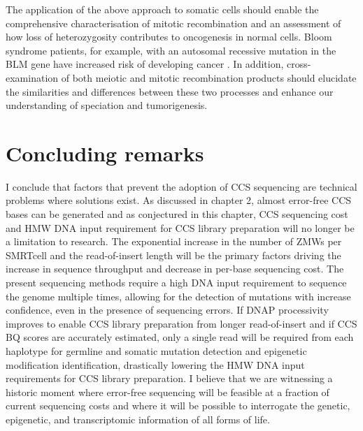 The application of the above approach to somatic cells should enable the comprehensive characterisation of mitotic recombination and an assessment of how loss of heterozygosity contributes to oncogenesis in normal cells. Bloom syndrome patients, for example, with an autosomal recessive mutation in the BLM gene have increased risk of developing cancer \cite{Gruber2002-ck}. In addition, cross-examination of both meiotic and mitotic recombination products should elucidate the similarities and differences between these two processes and enhance our understanding of speciation and tumorigenesis. 

\section{Concluding remarks}

I conclude that factors that prevent the adoption of CCS sequencing are technical problems where solutions exist. As discussed in chapter 2, almost error-free CCS bases can be generated and as conjectured in this chapter, CCS sequencing cost and HMW DNA input requirement for CCS library preparation will no longer be a limitation to research. The exponential increase in the number of ZMWs per SMRTcell and the read-of-insert length will be the primary factors driving the increase in sequence throughput and decrease in per-base sequencing cost. The present sequencing methods require a high DNA input requirement to sequence the genome multiple times, allowing for the detection of mutations with increase confidence, even in the presence of sequencing errors. If DNAP processivity improves to enable CCS library preparation from longer read-of-insert and if CCS BQ scores are accurately estimated, only a single read will be required from each haplotype for germline and somatic mutation detection and epigenetic modification identification, drastically lowering the HMW DNA input requirements for CCS library preparation. I believe that we are witnessing a historic moment where error-free sequencing will be feasible at a fraction of current sequencing costs and where it will be possible to interrogate the genetic, epigenetic, and transcriptomic information of all forms of life.  









